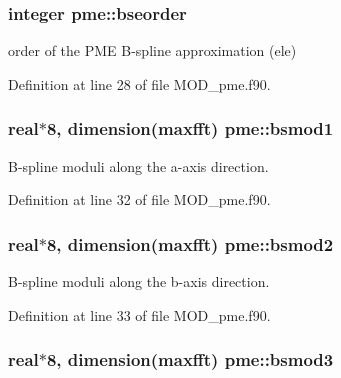 \hypertarget{classpme_ac9f3d5f19c70ddc7c4c3bb922e176832}{
\subsubsection[{bseorder}]{\setlength{\rightskip}{0pt plus 5cm}integer pme\-::bseorder}}\label{classpme_ac9f3d5f19c70ddc7c4c3bb922e176832}


order of the P\-M\-E B-\/spline approximation (ele) 



Definition at line 28 of file M\-O\-D\-\_\-pme.\-f90.

\hypertarget{classpme_a3d0155a6c5f49786b2a71081d6862121}{
\subsubsection[{bsmod1}]{\setlength{\rightskip}{0pt plus 5cm}real$\ast$8, dimension(maxfft) pme\-::bsmod1}}\label{classpme_a3d0155a6c5f49786b2a71081d6862121}


B-\/spline moduli along the a-\/axis direction. 



Definition at line 32 of file M\-O\-D\-\_\-pme.\-f90.

\hypertarget{classpme_a0ebaead01665855789c376258ec2ca3d}{
\subsubsection[{bsmod2}]{\setlength{\rightskip}{0pt plus 5cm}real$\ast$8, dimension(maxfft) pme\-::bsmod2}}\label{classpme_a0ebaead01665855789c376258ec2ca3d}


B-\/spline moduli along the b-\/axis direction. 



Definition at line 33 of file M\-O\-D\-\_\-pme.\-f90.

\hypertarget{classpme_a5a6a1eff12e64abc65b3a5f38f2a4cc8}{
\subsubsection[{bsmod3}]{\setlength{\rightskip}{0pt plus 5cm}real$\ast$8, dimension(maxfft) pme\-::bsmod3}}\label{classpme_a5a6a1eff12e64abc65b3a5f38f2a4cc8}


